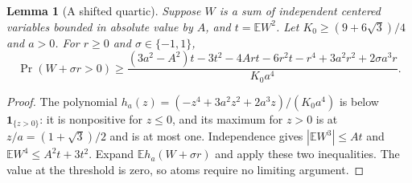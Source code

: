 \documentclass[11pt,a4paper]{article}
\numberwithin{equation}{section}
\newtheorem{lemma}[theorem]{Lemma}
\theoremstyle{definition}
\theoremstyle{remark}
\begin{document}
\begin{lemma}[A shifted quartic]\label{cut49:shortloc:quartic}
Suppose $W$ is a sum of independent centered variables bounded in absolute
value by $A$, and $t=\mathbb E W^2$. Let $K_0\ge(9+6\sqrt3)/4$ and $a>0$.
For $r\ge0$ and $\sigma\in\{-1,1\}$,
\begin{equation}\label{cut49:shortloc:quarticformula}
 \Pr(W+\sigma r>0)\ge
 \frac{(3a^2-A^2)t-3t^2-4Art-6r^2t-r^4
                      +3a^2r^2+2\sigma a^3r}{K_0a^4}.
\end{equation}
\end{lemma}
\begin{proof}
The polynomial $h_a(z)=(-z^4+3a^2z^2+2a^3z)/(K_0a^4)$ is below
$\mathbf1_{\{z>0\}}$: it is nonpositive for $z\le0$, and its maximum for
$z>0$ is at $z/a=(1+\sqrt3)/2$ and is at most one. Independence gives
$|\mathbb E W^3|\le At$ and $\mathbb E W^4\le A^2t+3t^2$.
Expand $\mathbb Eh_a(W+\sigma r)$ and apply these two inequalities.
The value at the threshold is zero, so atoms require no limiting argument.
\end{proof}
\end{document}
